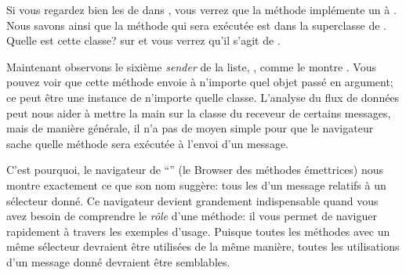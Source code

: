 \documentclass[a4paper,10pt,twoside]{book}
\begin{document}
Si vous regardez bien les \senders de  dans , vous verrez que la méthode implémente un  à \super. Nous savons ainsi que la méthode qui sera exécutée est dans la superclasse de . Quelle est cette classe? \Actclickz sur  et vous verrez qu'il s'agit de .

Maintenant observons le sixième \emph{sender} de la liste,
, comme le montre .
Vous pouvez voir que cette méthode envoie  à n'importe quel objet 
passé en argument; ce peut être une instance de n'importe quelle classe.
L'analyse du flux de données peut nous aider à mettre la main sur la classe du 
receveur de certains messages, mais de manière générale, il n'a pas de moyen simple 
pour que le navigateur sache quelle méthode sera exécutée à l'envoi d'un message.

C'est pourquoi, le navigateur de ``\senders'' (\ie le Browser des
méthodes émettrices) nous montre exactement ce que son nom
suggère: tous  les \senders d'un message relatifs à un sélecteur donné. 
Ce navigateur devient grandement indispensable quand vous avez besoin
de comprendre le \emph{rôle} d'une méthode: il vous permet de
naviguer rapidement à travers les exemples d'usage. %
Puisque toutes les méthodes avec un même sélecteur devraient être utilisées de la même manière, toutes les utilisations d'un message donné devraient être semblables.

\end{document}
